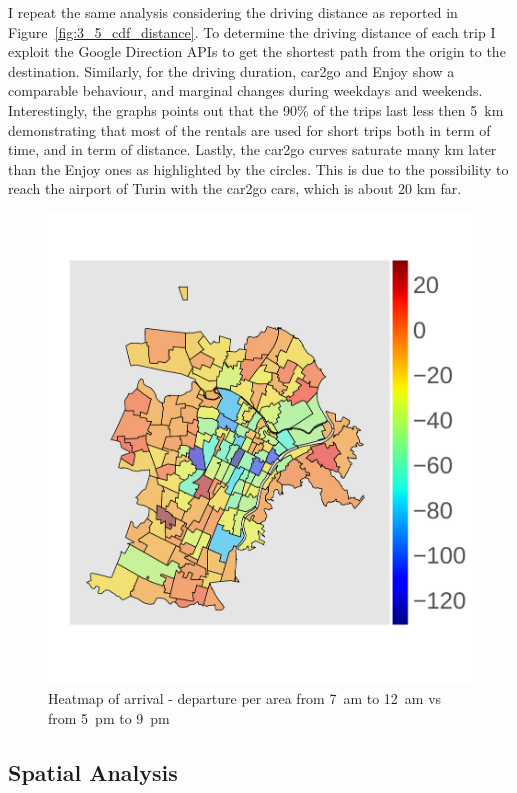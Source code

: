 I repeat the same analysis considering the driving distance as reported in Figure~\ref{fig:3_5_cdf_distance}.
To determine the driving distance of each trip I exploit the Google Direction APIs to get the shortest path from the origin to the destination. Similarly, for the driving duration, car2go and Enjoy show a comparable behaviour, and marginal changes during weekdays and weekends. Interestingly, the graphs points out that the 90\% of the trips last less then 5~km demonstrating that most of the rentals are used for short trips both in term of time, and in term of distance. Lastly, the car2go curves saturate many km later than the Enjoy ones as highlighted by the circles. This is due to the possibility to reach the airport of Turin with the car2go cars, which is about 20 km far. 



\begin{figure}[h!]
\centering
\vspace{-10pt}
 \includegraphics[width=0.75\columnwidth]{figures/clorophlet_o_minus_o1.pdf}
 \vspace{-10pt}
 \caption{Heatmap of arrival - departure per area from 7~am to 12~am vs from 5~pm to 9~pm \label{fig:3_5_heatmap_arr_dep}}
\end{figure}


\subsection{Spatial Analysis}  


